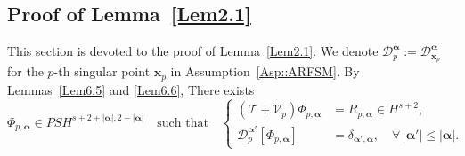 \documentclass{sn-jnl}%
\numberwithin{equation}{section}
\theoremstyle{thmstyleone}%
\theoremstyle{thmstyletwo}%
\theoremstyle{thmstylethree}%
\begin{document}
\subsection{Proof of \texorpdfstring{Lemma~\ref{Lem2.1}}{Theorem X}}
\label{subsec:AR3}
This section is devoted to the proof of Lemma~\ref{Lem2.1}.
We denote $\mathcal{D}_{p}^{\bm \alpha} := \mathcal{D}^{\bm \alpha}_{\bm x_p}$ for the $p$-th singular point $\bm x_p$ in Assumption~\ref{Asp::ARFSM}.  By  Lemmas~\ref{Lem6.5} and \ref{Lem6.6}, There exists 
\begin{equation}\label{Eq-6.3-01}
\Phi_{p,\bm \alpha}\in PSH^{s+2+|\bm \alpha|,2-|\bm \alpha|}
\quad \text{such that} \quad
\left\{
\begin{aligned}
(\mathcal{T}+\mathcal{V}_p)\Phi_{p,\bm \alpha}
&=
R_{p,\bm \alpha}\in H^{s+2},\\
\mathcal{D}_{p}^{\bm \alpha'}[\Phi_{p,\bm \alpha}]
&=
\delta_{\bm \alpha',\bm \alpha},
\quad
\forall\, |\bm \alpha'|\le |\bm \alpha|.
\end{aligned}
\right.
\end{equation}
\end{document}
